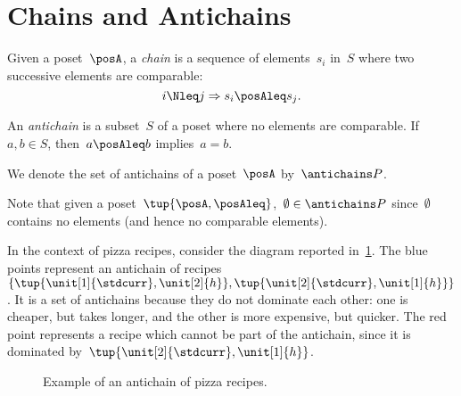 

\section{Chains and Antichains}
\label{sec:chains-antichains}

\begin{definition}
  \label{def:chain}
  Given a poset~$\posA$, a \emph{chain} is a sequence of elements~${s_i}$ in~$S$ where two successive elements are comparable:
  \begin{equation}
    i \Nleq j \Rightarrow s_i \posAleq s_j.
  \end{equation}
\end{definition}


\begin{definition}
  \label{def:antichain}
  An \emph{antichain} is a subset~$S$ of a poset where no elements are comparable. If~$a,b \in S$, then~$a \posAleq b$ implies~$a=b$.
\end{definition}
\begin{remark}
  We denote the set of antichains of a poset~$\posA$ by~$\antichains P$.
\end{remark}
\begin{remark}
  Note that given a poset~$\tup{\posA,\posAleq}$,~$\emptyset \in \antichains P$ since~$\emptyset$ contains no elements (and hence no comparable elements).
\end{remark}

In the context of pizza recipes, consider the diagram reported in~\cref{fig:antichain}. The blue points represent an antichain of recipes~$\{\tup{\unit[1]{\stdcurr},\unit[2]{h}},\tup{\unit[2]{\stdcurr},\unit[1]{h}}\}$.
It is a set of antichains because they do not dominate each other: one is cheaper, but takes longer, and the other is more expensive, but quicker.
The red point represents a recipe which cannot be part of the antichain, since it is dominated by~$\tup{\unit[2]{\stdcurr},\unit[1]{h}}$.

\begin{figure}[h!]
  \begin{center}
  \end{center}
  \caption{Example of an antichain of pizza recipes. \label{fig:antichain}}
\end{figure}


